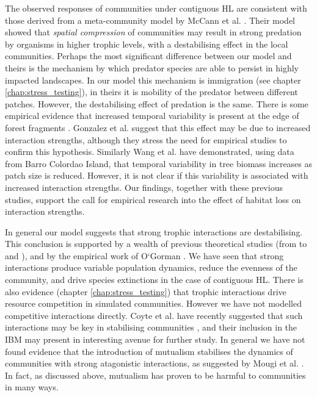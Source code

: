 The observed responses of communities under contiguous HL are consistent with those derived from a meta-community model by McCann et al. \cite{mccann2005dynamics}. Their model showed that \emph{spatial compression} of communities may result in strong predation by organisms in higher trophic levels, with a destabilising effect in the local communities. Perhaps the most significant difference between our model and theirs is the mechanism by which predator species are able to persist in highly impacted landscapes. In our model this mechanism is immigration (see chapter \ref{chap:stress_testing}), in theirs it is mobility of the predator between different patches. However, the destabilising effect of predation is the same. There is some empirical evidence that increased temporal variability is present at the edge of forest fragments \cite{ewers2006continuous}. Gonzalez et al. \cite{gonzalez2011disentangled} suggest that this effect may be due to increased interaction strengths, although they stress the need for empirical studies to confirm this hypothesis. Similarly Wang et al. \cite{wang2014ecosystem} have demonstrated, using data from Barro Colordao Island, that temporal variability in tree biomass increases as patch size is reduced. However, it is not clear if this variability is associated with increased interaction strengths. Our findings, together with these previous studies, support the call for empirical research into the effect of habitat loss on interaction strengths.

In general our model suggests that strong trophic interactions are destabilising. This conclusion is supported by a wealth of previous theoretical studies (from \cite{may1972will} to \cite{mccann1998weak} and \cite{neutel2002stability}), and by the empirical work of O`Gorman \cite{o2009perturbations}. We have seen that strong interactions produce variable population dynamics, reduce the evenness of the community, and drive species extinctions in the case of contiguous HL. There is also evidence (chapter \ref{chap:stress_testing}) that trophic interactions drive resource competition in simulated communities. However we have not modelled competitive interactions directly. Coyte et al. have recently suggested that such interactions may be key in stabilising communities \cite{coyte2015ecology}, and their inclusion in the IBM may present in interesting avenue for further study. In general we have not found evidence that the introduction of mutualism stabilises the dynamics of communities with strong atagonistic interactions, as suggested by Mougi et al. \cite{mougi2012diversity}. In fact, as discussed above, mutualism has proven to be harmful to communities in many ways.

